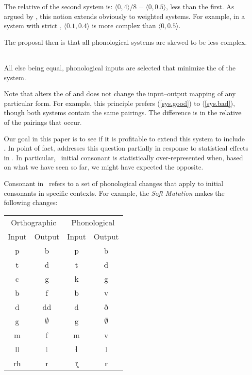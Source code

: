 \documentclass[output=paper,
modfonts
]{LSP/langsci}
\begin{document}
\noindent The relative  of the second system is: $\langle0,4\rangle/8 = \langle0,0.5\rangle$, less than the first. As argued by \citet{inopt.phon}, this notion extends obviously to weighted  systems. For example, in a system with strict , $\langle0.1,0.4\rangle$ is more complex than $\langle0,0.5\rangle$.

The proposal then is that all phonological systems are skewed to be less complex.

\ea
\label{input.opt}
\textbf{\io} \\
All else being equal, phonological inputs are selected that minimize the  of the system.
\z

\noindent Note that  \add{(\ref{input.opt})} alters the  of  and does not change the input--output mapping of any particular form. For example, this principle prefers (\ref{sys.good}) to (\ref{sys.bad}), though both systems contain the same pairings. The difference is in the relative  of the pairings that occur.

Our goal in this paper is to see if it is profitable to extend this system to include . In point of fact, \citet{inopt.phon} addresses this question partially in response to statistical effects in \w. In particular, \w\ initial consonant  is statistically over-represented when, based on what we have seen so far, we might have expected the opposite.

Consonant  in \w\ refers to a set of phonological changes that apply to initial consonants in specific  contexts. For example, the \emph{Soft Mutation} makes the following changes:

\ea
\begin{tabular}[t]{cc|cc}
\multicolumn{2}{c|}{Orthographic} & \multicolumn{2}{c}{Phonological} \\
Input & Output      & Input & Output \\
\hline
p     & b           & p     & b \\
t     & d           & t     & d \\
c     & g           & k     & g \\
b     & f           & b     & v \\
d     & dd          & d     & ð \\
g     & $\emptyset$ & g     & $\emptyset$ \\
m     & f           & m     & v \\
ll    & l           & ɬ     & l \\
rh    & r           & r̥     & r
\end{tabular}
\z
\end{document}
